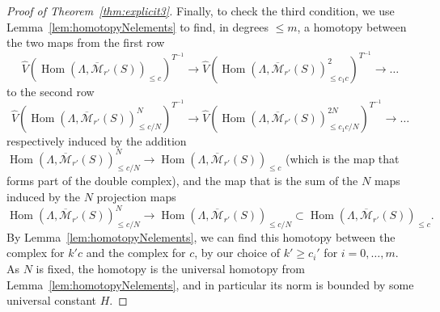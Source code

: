 \documentclass[11pt]{amsart}
\DeclareMathOperator{\Hom}{Hom}
\numberwithin{equation}{section}
\numberwithin{theorem}{section}
\theoremstyle{definition}
\begin{document}
\begin{proof}[Proof of Theorem~\ref{thm:explicit3}]
Finally, to check the third condition, we use Lemma~\ref{lem:homotopyNelements} to find, in degrees $\leq m$, a homotopy between the two maps from the first row
\[
\widehat{V}(\Hom(\Lambda,\overline{\mathcal M}_{r'}(S))_{\leq c})^{T^{-1}}\to \widehat{V}(\Hom(\Lambda,\overline{\mathcal M}_{r'}(S))_{\leq c_1c}^2)^{T^{-1}}\to \ldots
\]
to the second row
\[
\widehat{V}(\Hom(\Lambda,\overline{\mathcal M}_{r'}(S))_{\leq c/N}^N)^{T^{-1}}\to \widehat{V}(\Hom(\Lambda,\overline{\mathcal M}_{r'}(S))_{\leq c_1c/N}^{2N})^{T^{-1}}\to \ldots
\]
respectively induced by the addition $\Hom(\Lambda,\overline{\mathcal M}_{r'}(S))_{\leq c/N}^N\to \Hom(\Lambda,\overline{\mathcal M}_{r'}(S))_{\leq c}$ (which is the map that forms part of the double complex), and the map that is the sum of the $N$ maps induced by the $N$ projection maps
\[
\Hom(\Lambda,\overline{\mathcal M}_{r'}(S))_{\leq c/N}^N\to \Hom(\Lambda,\overline{\mathcal M}_{r'}(S))_{\leq c/N}\subset \Hom(\Lambda,\overline{\mathcal M}_{r'}(S))_{\leq c}.
\]
By Lemma~\ref{lem:homotopyNelements}, we can find this homotopy between the complex for $k'c$ and the complex for $c$, by our choice of $k'\geq c_i'$ for $i=0,\ldots,m$. As $N$ is fixed, the homotopy is the universal homotopy from Lemma~\ref{lem:homotopyNelements}, and in particular its norm is bounded by some universal constant $H$.


\end{proof}
\end{document}
